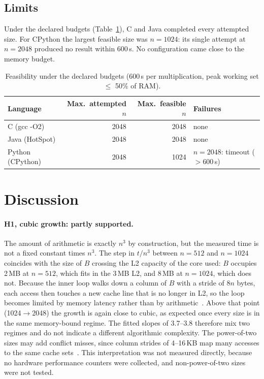 \documentclass[11pt,a4paper]{article}
\begin{document}
\subsection{Limits}
Under the declared budgets (Table~\ref{tab:limits}), C and Java completed every attempted size. For
CPython the largest feasible size was $n = 1024$: its single attempt at $n = 2048$ produced no result
within 600\,s. No configuration came close to the memory budget.

\begin{table}[htbp]
  \centering\small
  \caption{Feasibility under the declared budgets (600\,s per multiplication, peak working set $\le$ 50\% of RAM).}
  \label{tab:limits}
  \begin{tabular}{lrrl}
    \toprule
    Language & Max.\ attempted $n$ & Max.\ feasible $n$ & Failures \\
    \midrule
    C (gcc -O2)      & 2048 & 2048 & none \\
    Java (HotSpot)   & 2048 & 2048 & none \\
    Python (CPython) & 2048 & 1024 & $n=2048$: timeout ($>600$\,s) \\
    \bottomrule
  \end{tabular}
\end{table}

\section{Discussion}

\paragraph{H1, cubic growth: partly supported.} The amount of arithmetic is exactly $n^3$ by
construction, but the measured time is not a fixed constant times $n^3$. The step in $t/n^3$
between $n = 512$ and $n = 1024$ coincides with the size of $B$ crossing the L2 capacity of the core
used: $B$ occupies 2\,MB at $n = 512$, which fits in the 3\,MB L2, and 8\,MB at $n = 1024$, which does not.
Because the inner loop walks down a column of $B$ with a stride of $8n$ bytes, each access then
touches a new cache line that is no longer in L2, so the loop becomes limited by memory latency
rather than by arithmetic~\cite{drepper2007,hennessy2017}. Above that point (1024$\to$2048) the growth is again close to
cubic, as expected once every size is in the same memory-bound regime. The fitted slopes of 3.7--3.8
therefore mix two regimes and do not indicate a different algorithmic complexity. The power-of-two
sizes may add conflict misses, since column strides of 4--16\,KB map many accesses to the same cache
sets~\cite{lam1991}. This interpretation was not measured directly, because no hardware performance
counters were collected, and non-power-of-two sizes were not tested.
\end{document}
